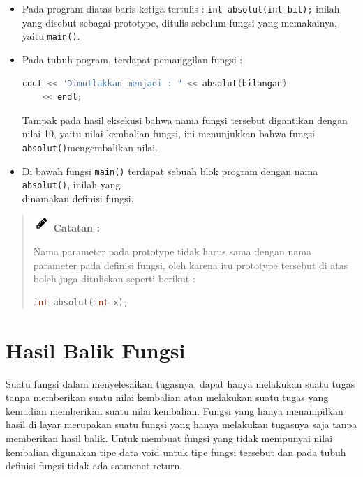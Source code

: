 \begin{itemize}

\item
  Pada program diatas baris ketiga tertulis :
  \texttt{int\ absolut(int\ bil);} inilah yang disebut sebagai
  prototype, ditulis sebelum fungsi yang memakainya, yaitu
  \texttt{main()}.\\
\item
  Pada tubuh pogram, terdapat pemanggilan fungsi :


\begin{lstlisting}[language=c++, numbers=none]
	cout << "Dimutlakkan menjadi : " << absolut(bilangan)
	<< endl;
\end{lstlisting}

Tampak pada hasil eksekusi bahwa nama fungsi tersebut digantikan dengan
nilai 10, yaitu nilai kembalian fungsi, ini menunjukkan bahwa fungsi
\texttt{absolut()}mengembalikan nilai.


\item
  Di bawah fungsi \texttt{main()} terdapat sebuah blok program dengan
  nama \texttt{absolut()}, inilah yang\\
  dinamakan definisi fungsi.

\end{itemize}
\begin{quotation}
		\includegraphics{../manuscript/images/pencil.png}	 \textbf{Catatan :}
		
		Nama parameter pada prototype tidak
		harus sama dengan nama parameter pada definisi fungsi, oleh karena itu
		prototype tersebut di atas boleh juga dituliskan seperti berikut :
		
\begin{lstlisting}[language=c++, numbers=none]
int absolut(int x);
\end{lstlisting}
	
	 
\end{quotation}


\section{Hasil Balik Fungsi}\label{hasil-balik-fungsi}

Suatu fungsi dalam menyelesaikan tugasnya, dapat hanya melakukan suatu
tugas tanpa memberikan suatu nilai kembalian atau melakukan suatu tugas
yang kemudian memberikan suatu nilai kembalian. Fungsi yang hanya
menampilkan hasil di layar merupakan suatu fungsi yang hanya melakukan
tugasnya saja tanpa memberikan hasil balik. Untuk membuat fungsi yang
tidak mempunyai nilai kembalian digunakan tipe data void untuk tipe
fungsi tersebut dan pada tubuh definisi fungsi tidak ada satmenet
return.

